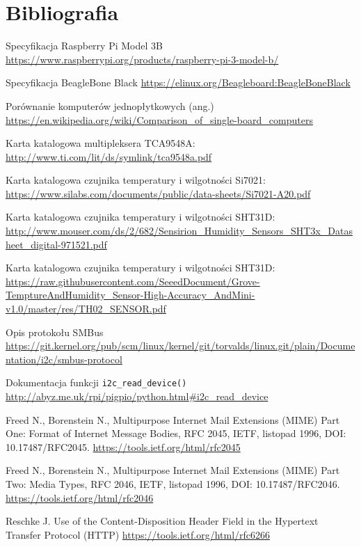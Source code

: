 \documentclass[a4paper,12pt,twoside]{article}
\begin{document}
\section{Bibliografia}
\begin{thebibliography}{9}

Specyfikacja Raspberry Pi Model 3B
\url{https://www.raspberrypi.org/products/raspberry-pi-3-model-b/}

Specyfikacja BeagleBone Black
\url{https://elinux.org/Beagleboard:BeagleBoneBlack}

Porównanie komputerów jednopłytkowych (ang.)
\url{https://en.wikipedia.org/wiki/Comparison_of_single-board_computers}

Karta katalogowa multipleksera TCA9548A:
\url{http://www.ti.com/lit/ds/symlink/tca9548a.pdf}

Karta katalogowa czujnika temperatury i wilgotności Si7021:
\url{https://www.silabs.com/documents/public/data-sheets/Si7021-A20.pdf}

Karta katalogowa czujnika temperatury i wilgotności SHT31D:
\url{http://www.mouser.com/ds/2/682/Sensirion_Humidity_Sensors_SHT3x_Datasheet_digital-971521.pdf}

Karta katalogowa czujnika temperatury i wilgotności SHT31D:
\url{https://raw.githubusercontent.com/SeeedDocument/Grove-TemptureAndHumidity_Sensor-High-Accuracy_AndMini-v1.0/master/res/TH02_SENSOR.pdf}

Opis protokołu SMBus
\url{https://git.kernel.org/pub/scm/linux/kernel/git/torvalds/linux.git/plain/Documentation/i2c/smbus-protocol}

Dokumentacja funkcji \texttt{i2c{\_}read{\_}device()}
\url{http://abyz.me.uk/rpi/pigpio/python.html#i2c_read_device}

Freed N., Borenstein N., Multipurpose Internet Mail Extensions (MIME) Part One: Format of Internet Message Bodies, RFC 2045, IETF, listopad 1996, DOI: 10.17487/RFC2045.
\url{https://tools.ietf.org/html/rfc2045}

Freed N., Borenstein N., Multipurpose Internet Mail Extensions (MIME) Part Two: Media Types, RFC 2046, IETF, listopad 1996, DOI: 10.17487/RFC2046.
\url{https://tools.ietf.org/html/rfc2046}

Reschke J. Use of the Content-Disposition Header Field in the Hypertext Transfer Protocol (HTTP)
\url{https://tools.ietf.org/html/rfc6266}


\end{thebibliography}
\end{document}
